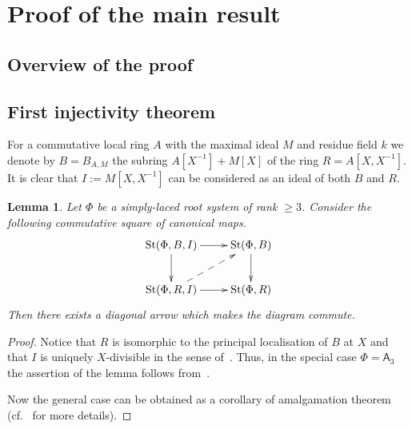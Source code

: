 \documentclass[oneside, 10pt]{amsart}
\newtheorem{lemma}{Lemma}
\theoremstyle{remark}
\theoremstyle{definition}
\DeclareMathOperator{\St}{St}
\newcommand{\rA}{\mathsf{A}}
\numberwithin{equation}{section}
\begin{document}
\section{Proof of the main result}
\subsection{Overview of the proof}
\subsection{First injectivity theorem}
For a commutative local ring $A$ with the maximal ideal $M$ and residue field $k$
we denote by $B = B_{A, M}$ the subring $A[X^{-1}] + M[X]$ of the ring $R = A[X, X^{-1}]$.
It is clear that $I := M[X, X^{-1}]$ can be considered as an ideal of both $B$ and $R$.
\begin{lemma}\label{lem:lemma32} Let $\Phi$ be a simply-laced root system of rank $\geq 3$.
Consider the following commutative square of canonical maps.
\[ \xymatrix{
    \St(\Phi, B, I) \ar[r] \ar[d] & \St(\Phi, B) \ar[d] \\
    \St(\Phi, R, I) \ar[r] \ar@{-->}[ur] & \St(\Phi, R)
   } \]
Then there exists a diagonal arrow which makes the diagram commute.   
\end{lemma} 
\begin{proof}
 Notice that $R$ is isomorphic to the principal localisation of $B$ at $X$
  and that $I$ is uniquely $X$-divisible in the sense of~\cite[\S~4]{LS17}.
 Thus, in the special case $\Phi = \rA_3$ the assertion of the lemma follows from~\cite[Theorem~3]{LS17}.
 
 Now the general case can be obtained as a corollary of amalgamation theorem~\cite[Theorem~9]{S15}
  (cf.~\cite[\S~4]{LS17} for more details).
\end{proof}
\end{document}
